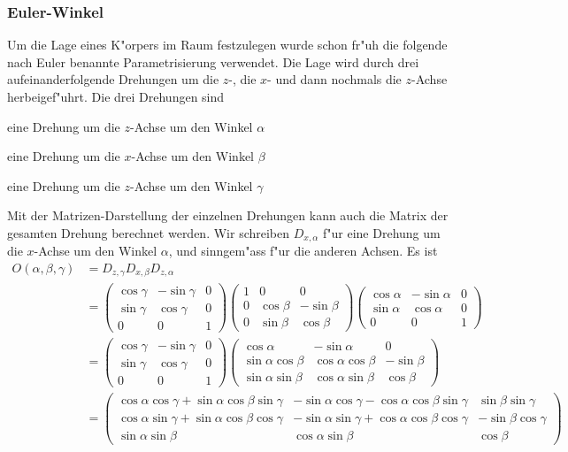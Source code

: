 \subsubsection{Euler-Winkel}
Um die Lage eines K"orpers im Raum festzulegen wurde schon fr"uh
die folgende nach Euler benannte  Parametrisierung verwendet.
Die Lage wird durch drei aufeinanderfolgende Drehungen um die $z$-,
die $x$- und dann nochmals die $z$-Achse herbeigef"uhrt.
Die drei
Drehungen sind
\begin{compactenum}
\item eine Drehung um die $z$-Achse um den Winkel $\alpha$
\item eine Drehung um die $x$-Achse um den Winkel $\beta$
\item eine Drehung um die $z$-Achse um den Winkel $\gamma$
\end{compactenum}
Mit der Matrizen-Darstellung der einzelnen Drehungen kann auch
die Matrix der gesamten Drehung berechnet werden.
Wir schreiben
$D_{x,\alpha}$ f"ur eine Drehung um die $x$-Achse um den Winkel
$\alpha$, und sinngem"ass f"ur die anderen Achsen.
Es ist
\begin{align*}
O(\alpha,\beta,\gamma)
&=
D_{z,\gamma}
D_{x,\beta}
D_{z,\alpha}
\\
&=
\begin{pmatrix}
\cos\gamma&-\sin\gamma&0\\
\sin\gamma&\cos\gamma&0\\
0&0&1
\end{pmatrix}
\begin{pmatrix}
1&0&0\\
0&\cos\beta&-\sin\beta\\
0&\sin\beta&\cos\beta
\end{pmatrix}
\begin{pmatrix}
\cos\alpha&-\sin\alpha&0\\
\sin\alpha&\cos\alpha&0\\
0&0&1
\end{pmatrix}
\\
&=
\begin{pmatrix}
\cos\gamma&-\sin\gamma&0\\
\sin\gamma&\cos\gamma&0\\
0&0&1
\end{pmatrix}
\begin{pmatrix}
\cos\alpha&-\sin\alpha&0\\
\sin\alpha\cos\beta&\cos\alpha\cos\beta&-\sin\beta\\
\sin\alpha\sin\beta&\cos\alpha\sin\beta&\cos\beta
\end{pmatrix}
\\
&=
\begin{pmatrix}
\cos\alpha\cos\gamma+\sin\alpha\cos\beta\sin\gamma
        &-\sin\alpha\cos\gamma-\cos\alpha\cos\beta\sin\gamma
                &\sin\beta\sin\gamma\\
\cos\alpha\sin\gamma+\sin\alpha\cos\beta\cos\gamma
        &-\sin\alpha\sin\gamma+\cos\alpha\cos\beta\cos\gamma
                &-\sin\beta\cos\gamma\\
\sin\alpha\sin\beta&\cos\alpha\sin\beta&\cos\beta
\end{pmatrix}
\end{align*}
